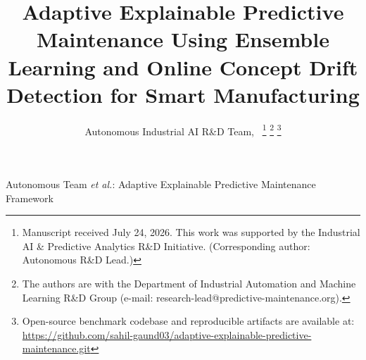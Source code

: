 \documentclass[journal]{IEEEtran}
\begin{document}
\title{Adaptive Explainable Predictive Maintenance Using Ensemble Learning and Online Concept Drift Detection for Smart Manufacturing}

\author{Autonomous Industrial AI R\&D Team,~
\thanks{Manuscript received July 24, 2026. This work was supported by the Industrial AI \& Predictive Analytics R\&D Initiative. (Corresponding author: Autonomous R\&D Lead.)}
\thanks{The authors are with the Department of Industrial Automation and Machine Learning R\&D Group (e-mail: research-lead@predictive-maintenance.org).}
\thanks{Open-source benchmark codebase and reproducible artifacts are available at: \url{https://github.com/sahil-gaund03/adaptive-explainable-predictive-maintenance.git}}
}

%
{Autonomous Team \MakeLowercase{\textit{et al.}}: Adaptive Explainable Predictive Maintenance Framework}

\maketitle
\end{document}
